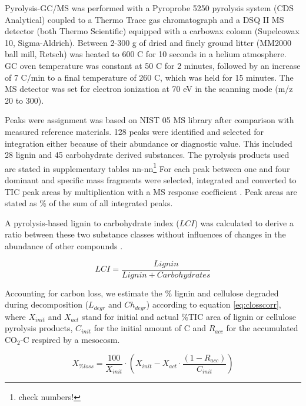 Pyrolysis-GC/MS was performed with a Pyroprobe 5250 pyrolysis system (CDS Analytical) coupled to a Thermo Trace gas chromatograph and a DSQ II MS detector (both Thermo Scientific) equipped with a carbowax colomn (Supelcowax 10, Sigma-Aldrich). Between 2-300 \textmu g of dried and finely ground litter (MM2000 ball mill, Retsch) was heated to 600 \textdegree C for 10 seconds in a helium atmosphere. GC oven temperature was constant at 50 \textdegree C for 2 minutes, followed by an increase of 7 \textdegree C/min to a final temperature of 260 \textdegree C, which was held for 15 minutes. The MS detector was set for electron ionization at 70 eV in the scanning mode (m/z 20 to 300).

Peaks were assignment was based on NIST 05 MS library after comparison with measured reference materials. 128 peaks were identified and selected for integration either because of their abundance or diagnostic value. This included 28 lignin and 45 carbohydrate derived substances. The pyrolysis products used are stated in supplementary tables nn-nn\footnote{check numbers!} For each peak between one and four dominant and specific mass fragments were selected, integrated and converted to TIC peak areas by multiplication with a MS response coefficient \cite{Schellekens2009, Kuder1998}. Peak areas are stated as \% of the sum of all integrated peaks.

A pyrolysis-based lignin to carbohydrate index ($LCI$) was calculated to derive a ratio between these two substance classes without influences of changes in the abundance of other compounds . 

\begin{equation}
 LCI=\frac{Lignin}{Lignin + Carbohydrates}
\end{equation}


Accounting for carbon loss, we estimate the \% lignin and cellulose degraded during decomposition ($L_{degr}$ and $Ch_{degr}$)  according to equation \ref{eq:closscorr}, where \emph{$X_{init}$} and \emph{$X_{act}$} stand for initial and actual \%TIC area of lignin or cellulose pyrolysis products, \emph{$C_{init}$} for the initial amount of C and \emph{$R_{acc}$} for the accumulated CO$_2$-C respired by a mesocosm.

\begin{equation}
 X_{\% loss} = \frac{100}{X_{init}} \cdot \left ( X_{init}-X_{act}\cdot\frac{\left ( 1-R_{acc}\right ) }{C_{init}}\right )
 \label{eq:closscorr}
\end{equation}


